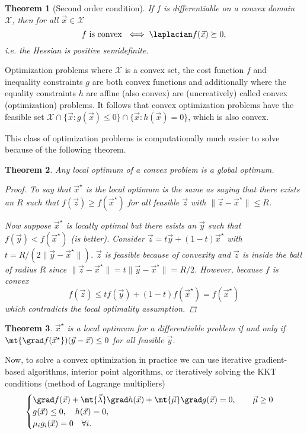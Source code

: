 \documentclass[margin=small]{hsrzf}
\newtheorem{thm}{Theorem}
\begin{document}
\begin{thm}[Second order condition]
  If $f$ is differentiable on a convex domain $\mathcal{X}$, then for all
  $\vec{x} \in \mathcal{X}$
  \[
    f \text{ is convex } \iff
    \laplacian f(\vec{x}) \succeq 0,
  \]
  i.e. the Hessian is positive semidefinite.
\end{thm}

Optimization problems where $\mathcal{X}$ is a convex set, the cost function
$f$ and inequality constraints $g$ are both convex functions and additionally
where the equality constraints $h$ are affine (also convex) are (uncreatively)
called convex (optimization) problems. It follows that convex optimization
problems have the feasible set $\mathcal{X} \cap \{\vec{x}: g(\vec{x}) \leq
0\} \cap \{\vec{x}: h(\vec{x}) = 0\}$, which is also convex.

This class of optimization problems is computationally much easier to solve
because of the following theorem. 

\begin{thm}
  Any local optimum of a convex problem is a global optimum.
  \begin{proof}
    To say that $\vec{x}^\star$ is the local optimum is the same as saying
    that there exists an $R$ such that $f(\vec{z}) \geq f(\vec{x}^\star)$ for
    all feasible $\vec{z}$ with $\|\vec{z} - \vec{x}^\star\| \leq R$.

    Now suppose $\vec{x}^\star$ is locally optimal but there esists an
    $\vec{y}$ such that $f(\vec{y}) < f(\vec{x}^\star)$ (is better). Consider
    $\vec{z} = t\vec{y} + (1-t)\vec{x}^\star$ with $t = R/(2\|\vec{y} -
    \vec{x}^\star\|)$. $\vec{z}$ is feasible because of convexity and
    $\vec{z}$ is inside the ball of radius $R$ since $\|\vec{z} -
    \vec{x}^\star\| = t\|\vec{y} - \vec{x}^\star\| = R/2$. However, because
    $f$ is convex
    \[
      f(\vec{z}) \leq tf(\vec{y}) + (1-t)f(\vec{x}^\star) = f(\vec{x}^\star)
    \]
    which contradicts the local optimality assumption.
  \end{proof}
\end{thm}

\begin{thm}
  $\vec{x}^\star$ is a local optimum for a differentiable problem if and only
  if $\mt{\grad f(\vec{x}^\star})(\vec{y} - \vec{x}) \leq 0$ for all feasible
  $\vec{y}$.
\end{thm}

Now, to solve a convex optimization in practice we can use iterative
gradient-based algorithms, interior point algorithms, or iteratively solving
the KKT conditions (method of Lagrange multipliers)
\[
  \begin{cases}
    \grad f(\vec{x}) + \mt{\vec{\lambda}}\grad h(\vec{x})
      + \mt{\vec{\mu}} \grad g(\vec{x}) = 0, \qquad \vec{\mu} \geq 0 \\
    g(\vec{x}) \leq 0, \quad h(\vec{x}) = 0, \\
    \mu_i g_i(\vec{x}) = 0 \quad \forall i.
  \end{cases}
\]
\end{document}
